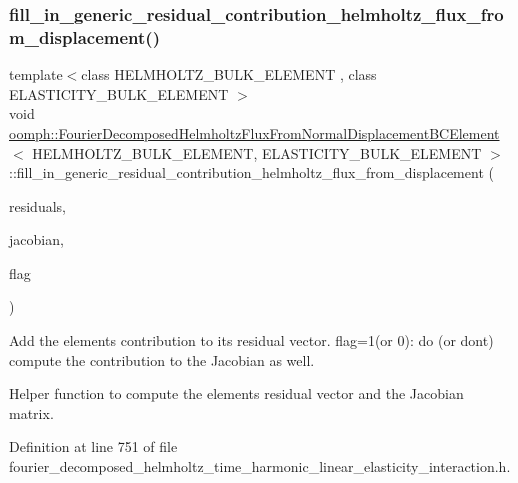 \subsubsection{\texorpdfstring{fill\+\_\+in\+\_\+generic\+\_\+residual\+\_\+contribution\+\_\+helmholtz\+\_\+flux\+\_\+from\+\_\+displacement()}{fill\_in\_generic\_residual\_contribution\_helmholtz\_flux\_from\_displacement()}}
{\footnotesize\ttfamily template$<$class H\+E\+L\+M\+H\+O\+L\+T\+Z\+\_\+\+B\+U\+L\+K\+\_\+\+E\+L\+E\+M\+E\+NT , class E\+L\+A\+S\+T\+I\+C\+I\+T\+Y\+\_\+\+B\+U\+L\+K\+\_\+\+E\+L\+E\+M\+E\+NT $>$ \\
void \hyperlink{classoomph_1_1FourierDecomposedHelmholtzFluxFromNormalDisplacementBCElement}{oomph\+::\+Fourier\+Decomposed\+Helmholtz\+Flux\+From\+Normal\+Displacement\+B\+C\+Element}$<$ H\+E\+L\+M\+H\+O\+L\+T\+Z\+\_\+\+B\+U\+L\+K\+\_\+\+E\+L\+E\+M\+E\+NT, E\+L\+A\+S\+T\+I\+C\+I\+T\+Y\+\_\+\+B\+U\+L\+K\+\_\+\+E\+L\+E\+M\+E\+NT $>$\+::fill\+\_\+in\+\_\+generic\+\_\+residual\+\_\+contribution\+\_\+helmholtz\+\_\+flux\+\_\+from\+\_\+displacement (\begin{DoxyParamCaption}\item[{\hyperlink{classoomph_1_1Vector}{Vector}$<$ double $>$ \&}]{residuals,  }\item[{\hyperlink{classoomph_1_1DenseMatrix}{Dense\+Matrix}$<$ double $>$ \&}]{jacobian,  }\item[{const unsigned \&}]{flag }\end{DoxyParamCaption})\hspace{0.3cm}{\ttfamily [private]}}



Add the element\textquotesingle{}s contribution to its residual vector. flag=1(or 0)\+: do (or don\textquotesingle{}t) compute the contribution to the Jacobian as well. 

Helper function to compute the element\textquotesingle{}s residual vector and the Jacobian matrix. 

Definition at line 751 of file fourier\+\_\+decomposed\+\_\+helmholtz\+\_\+time\+\_\+harmonic\+\_\+linear\+\_\+elasticity\+\_\+interaction.\+h.



